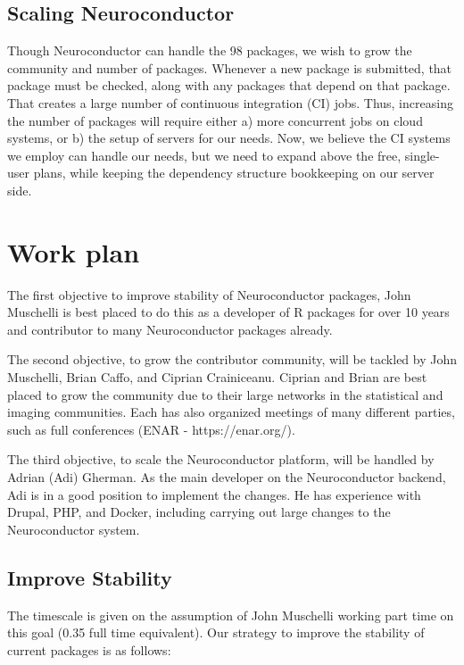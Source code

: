 \documentclass[]{elsarticle} %
\begin{document}
\hypertarget{scaling-neuroconductor}{%
\subsection{Scaling Neuroconductor}\label{scaling-neuroconductor}}

Though Neuroconductor can handle the 98 packages, we wish to grow the community and number of packages. Whenever a new package is submitted, that package must be checked, along with any packages that depend on that package. That creates a large number of continuous integration (CI) jobs. Thus, increasing the number of packages will require either a) more concurrent jobs on cloud systems, or b) the setup of servers for our needs. Now, we believe the CI systems we employ can handle our needs, but we need to expand above the free, single-user plans, while keeping the dependency structure bookkeeping on our server side.

\hypertarget{work-plan}{%
\section{Work plan}\label{work-plan}}

The first objective to improve stability of Neuroconductor packages, John Muschelli is best placed to do this as a developer of R packages for over 10 years and contributor to many Neuroconductor packages already.

The second objective, to grow the contributor community, will be tackled by
John Muschelli, Brian Caffo, and Ciprian Crainiceanu. Ciprian and Brian are best placed to grow the community due to their large networks in the statistical and imaging communities. Each has also organized meetings of many different parties, such as full conferences (ENAR - https://enar.org/).

The third objective, to scale the Neuroconductor platform, will be handled by Adrian (Adi) Gherman. As the main developer on the Neuroconductor backend, Adi is in a good position to implement the changes. He has experience with Drupal, PHP, and Docker, including carrying out large changes to the Neuroconductor system.

\hypertarget{improve-stability}{%
\subsection{Improve Stability}\label{improve-stability}}

The timescale is given on the assumption of John Muschelli working part
time on this goal (0.35 full time equivalent). Our strategy to improve the stability of current packages is as follows:
\end{document}
